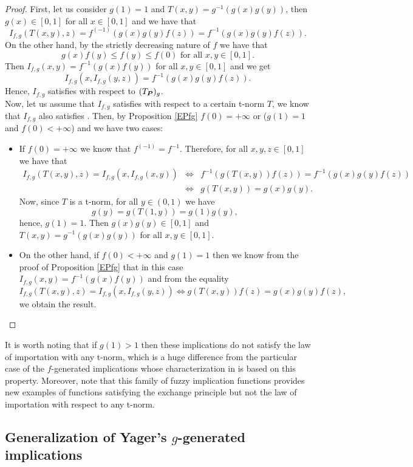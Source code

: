\begin{proof}
	First, let us consider $g(1)=1$ and $T(x,y)=g^{-1}(g(x)g(y))$, then  $g(x) \in [0,1]$ for all $x\in [0,1]$ and we have that
	$$I_{f,g}(T(x,y),z)=f^{(-1)}(g(x)g(y)f(z)) = f^{-1}(g(x)g(y)f(z)).$$
	On the other hand, by the strictly decreasing nature of $f$ we have that
	$$g(x)f(y) \leq f(y) \leq f(0) \text{ for all } x,y \in [0,1].$$
	Then $I_{f,g}(x,y)=f^{-1}(g(x)f(y))$ for all $x,y \in [0,1]$ and we get
	$$I_{f,g}(x,I_{f,g}(y,z))=f^{-1}(g(x)g(y)f(z)).$$
	Hence, $I_{f,g}$ satisfies \LI with respect to $(T_{\bm{P}})_g$.\\
	Now, let us assume that $I_{f,g}$ satisfies \LI with respect to a certain t-norm $T$, we know that $I_{f,g}$ also satisfies \EP. Then, by Proposition \ref{EPfg} $f(0) = + \infty$ or ($g(1)=1$ and $f(0) < + \infty$) and we have two cases:
	\begin{itemize}
		\item If $f(0)= + \infty$ we know that $f^{(-1)} = f^{-1}$. Therefore, for all $x,y,z \in [0,1]$ we have that
		\begin{eqnarray*}
			I_{f,g}(T(x,y),z)=I_{f,g}(x,I_{f,g}(x,y)) & \Leftrightarrow &   f^{-1}(g(T(x,y))f(z))= f^{-1}(g(x)g(y)f(z)) \\
			&\Leftrightarrow & g(T(x,y))=g(x)g(y).
		\end{eqnarray*}
		Now, since $T$ is a t-norm, for all $ y \in (0,1)$ we have
		$$g(y)=g(T(1,y))=g(1)g(y),$$
		hence, $g(1)=1$. Then $g(x)g(y) \in [0,1]$ and $T(x,y)=g^{-1}(g(x)g(y))$ for all $x,y \in [0,1]$.
		\item On the other hand, if $f(0) < +\infty$ and $g(1)=1$ then we know from the proof of Proposition \ref{EPfg} that in this case $I_{f,g}(x,y)=f^{-1}(g(x)f(y))$ and from the equality
		$$ I_{f,g}(T(x,y),z)=I_{f,g}(x,I_{f,g}(y,z)) \Leftrightarrow g(T(x,y))f(z) = g(x)g(y)f(z),$$
		we obtain the result.
	\end{itemize} 
\end{proof}

It is worth noting that if $g(1) > 1$ then these implications do not satisfy the law of importation with any t-norm, which is a huge difference from the particular case of the $f$-generated implications whose characterization in \cite{Massanet2012B} is based on this property. Moreover, note that this family of fuzzy implication functions provides new examples of functions satisfying the exchange principle but not the law of importation with respect to any t-norm. 

\subsection{Generalization of Yager's $g$-generated implications}\label{subsection:g-generated}

